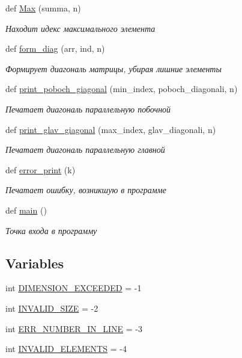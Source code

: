 \begin{DoxyCompactItemize}
def \hyperlink{namespacezad1__7_a6a71e5d3500d9d48fcb274d95e6bc7ef}{Max} (summa, n)
\begin{DoxyCompactList}\small\item\em Находит идекс максимального элемента \end{DoxyCompactList}\item 
def \hyperlink{namespacezad1__7_acdfea6715d348498eddf567680af04e7}{form\+\_\+diag} (arr, ind, n)
\begin{DoxyCompactList}\small\item\em Формирует диагональ матрицы, убирая лишние элементы \end{DoxyCompactList}\item 
def \hyperlink{namespacezad1__7_a45ca6620ee12215963586dbf0349d0f9}{print\+\_\+poboch\+\_\+giagonal} (min\+\_\+index, poboch\+\_\+diagonali, n)
\begin{DoxyCompactList}\small\item\em Печатает диагональ параллельную побочной \end{DoxyCompactList}\item 
def \hyperlink{namespacezad1__7_a0e157ac6a594195e0489db284ee6099b}{print\+\_\+glav\+\_\+giagonal} (max\+\_\+index, glav\+\_\+diagonali, n)
\begin{DoxyCompactList}\small\item\em Печатает диагональ параллельную главной \end{DoxyCompactList}\item 
def \hyperlink{namespacezad1__7_ac86b62e3975a9149e265609a78faa797}{error\+\_\+print} (k)
\begin{DoxyCompactList}\small\item\em Печатает ошибку, возникшую в программе \end{DoxyCompactList}\item 
def \hyperlink{namespacezad1__7_a8ab0946ca9b9e1167ddf26a5866ba6db}{main} ()
\begin{DoxyCompactList}\small\item\em Точка входа в программу \end{DoxyCompactList}\end{DoxyCompactItemize}
\subsection*{Variables}
\begin{DoxyCompactItemize}
\item 
int \hyperlink{namespacezad1__7_a4348fe99a091a729e664ae20ae198e5c}{D\+I\+M\+E\+N\+S\+I\+O\+N\+\_\+\+E\+X\+C\+E\+E\+D\+ED} = -\/1
\item 
int \hyperlink{namespacezad1__7_a902cdfbaac2f6c2d35a80024ea27e9ff}{I\+N\+V\+A\+L\+I\+D\+\_\+\+S\+I\+ZE} = -\/2
\item 
int \hyperlink{namespacezad1__7_a1e04c9c787059826e42cdfbd703961e8}{E\+R\+R\+\_\+\+N\+U\+M\+B\+E\+R\+\_\+\+I\+N\+\_\+\+L\+I\+NE} = -\/3
\item 
int \hyperlink{namespacezad1__7_a32c3be182bfdd83db4351c74e22aa7cc}{I\+N\+V\+A\+L\+I\+D\+\_\+\+E\+L\+E\+M\+E\+N\+TS} = -\/4
\end{DoxyCompactItemize}


